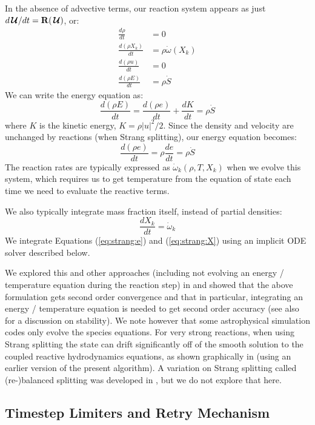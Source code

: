 \documentclass[times,preprint]{aastex631}
\newcommand{\omegadot}{\dot{\omega}}
\newcommand{\Sdot}{\dot{S}}
\newcommand{\odt}[1]{{\frac{{d#1}}{dt}}}
\newcommand{\Uc}{{\,\bm{\mathcal{U}}}}
\newcommand{\Rb}{{\bf R}}
\newcommand{\MarginPar}[1]{\marginpar{\vskip-\baselineskip\raggedright\tiny\sffamily\hrule\smallskip{\color{red}#1}\par\smallskip\hrule}}
\begin{document}
In the absence of advective terms, our reaction system appears as just
$d\Uc/dt = \Rb(\Uc)$, or:
\begin{align}
\odt{\rho} & = 0 \\
\odt{(\rho X_k)} &= \rho \omegadot(X_k) \\
\odt{(\rho u)} &= 0 \\
\odt{(\rho E)} &= \rho \Sdot
\end{align}
We can write the energy equation as:
\begin{equation}
\odt{(\rho E)} = \odt{(\rho e)} + \odt{K} = \rho \Sdot
\end{equation}
where $K$ is the kinetic energy, $K = \rho |u|^2/2$.  Since the density and velocity
are unchanged by reactions (when Strang splitting), our energy equation becomes:
\begin{equation}
\label{eq:strang:e}
\odt{(\rho e)} = \rho \odt{e} = \rho \Sdot
\end{equation}
The reaction rates are typically expressed as $\omegadot_k(\rho, T, X_k)$
when we evolve this system, which requires us to get temperature from
the equation of state each
time we need to evaluate the reactive terms.

We also typically integrate mass fraction itself, instead of partial
densities:
\begin{equation}
\label{eq:strang:X}
\odt{X_k} = \omegadot_k
\end{equation}
We integrate Equations (\ref{eq:strang:e}) and (\ref{eq:strang:X})
using an implicit ODE solver described below.

We explored this and other approaches (including not evolving an
energy / temperature equation during the reaction step) in
\citet{strang_rnaas} and showed that the above formulation gets second
order convergence and that in particular, integrating an energy / temperature
equation is needed to get second order accuracy (see also
\citealt{muller:1986} for a discussion on stability).  We note however
that some astrophysical simulation codes only evolve the species
equations.  For very strong reactions, when using Strang splitting the
state can drift significantly off of the smooth solution to the
coupled reactive hydrodynamics equations, as shown graphically in
\citet{astronum:2018} (using an earlier version of the present
algorithm).  A variation on Strang splitting called (re-)balanced
splitting was developed in \citet{speth:2013}, but we do not explore
that here. \MarginPar{keep this sentence?}


\subsection{Timestep Limiters and Retry Mechanism}
\end{document}
